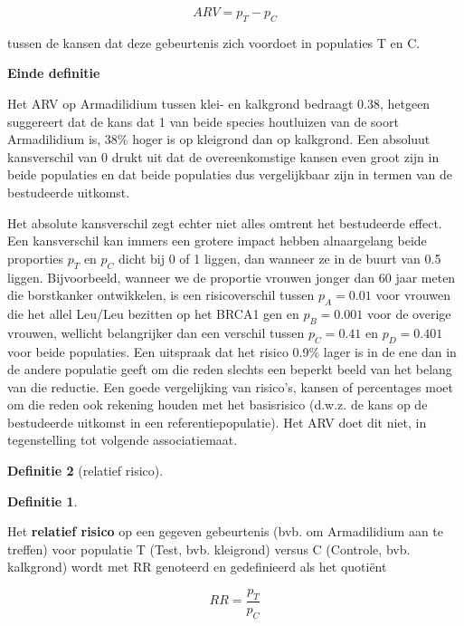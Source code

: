 \documentclass[
  12pt,dutch,coursenotes]{book}
\theoremstyle{definition}
\newtheorem{definition}{Definitie}[chapter]
\theoremstyle{definition}
\theoremstyle{definition}
\theoremstyle{remark}
\begin{document}
\begin{equation*}
ARV=p_T-p_C
\end{equation*}

tussen de kansen dat deze gebeurtenis zich voordoet in populaties T en C.

\textbf{Einde definitie}

Het ARV op Armadilidium tussen klei- en kalkgrond bedraagt 0.38, hetgeen suggereert dat de kans dat 1 van beide species houtluizen van de soort Armadilidium is, 38\% hoger is op kleigrond dan op kalkgrond. Een absoluut kansverschil
van 0 drukt uit dat de overeenkomstige kansen even groot zijn in beide
populaties en dat beide populaties dus vergelijkbaar zijn in termen van de bestudeerde uitkomst.

Het absolute kansverschil zegt echter niet alles omtrent het
bestudeerde effect. Een kansverschil kan immers een grotere impact hebben
alnaargelang beide proporties \(p_T\) en \(p_C\) dicht bij 0 of 1 liggen, dan
wanneer ze in de buurt van 0.5 liggen.
Bijvoorbeeld, wanneer we de proportie
vrouwen jonger dan 60 jaar meten die borstkanker ontwikkelen, is
een risicoverschil tussen \(p_A=0.01\) voor vrouwen die het allel Leu/Leu bezitten op het BRCA1 gen
en \(p_B=0.001\) voor de overige vrouwen, wellicht belangrijker dan een verschil tussen \(p_C=0.41\) en \(p_D=0.401\) voor beide populaties. Een uitspraak dat het risico 0.9\% lager is in de ene dan in de andere populatie geeft om die reden slechts een beperkt beeld van het belang van die reductie. Een goede vergelijking van risico's, kansen of percentages moet om die reden ook rekening houden met het basisrisico (d.w.z. de kans op de bestudeerde uitkomst in een referentiepopulatie). Het ARV doet dit niet, in tegenstelling tot volgende associatiemaat.

\begin{definition}[relatief risico]
\begin{definition}

\protect\hypertarget{def:unnamed-chunk-111}{}{\label{def:unnamed-chunk-111} \iffalse (relatief risico) \fi{} }

\end{definition}
\end{definition}

Het \textbf{relatief risico} op een gegeven gebeurtenis (bvb. om Armadilidium aan te treffen) voor populatie T (Test, bvb. kleigrond) versus C (Controle, bvb. kalkgrond) wordt met RR
genoteerd en gedefinieerd als het quotiënt

\begin{equation*}
RR=\frac{p_T}{p_C}
\end{equation*}
\end{document}
